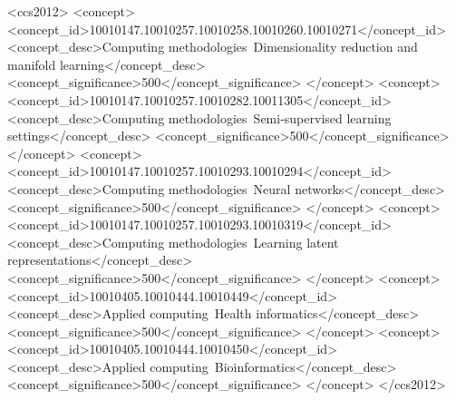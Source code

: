 \begin{CCSXML}
<ccs2012>
   <concept>
       <concept_id>10010147.10010257.10010258.10010260.10010271</concept_id>
       <concept_desc>Computing methodologies~Dimensionality reduction and manifold learning</concept_desc>
       <concept_significance>500</concept_significance>
       </concept>
   <concept>
       <concept_id>10010147.10010257.10010282.10011305</concept_id>
       <concept_desc>Computing methodologies~Semi-supervised learning settings</concept_desc>
       <concept_significance>500</concept_significance>
       </concept>
   <concept>
       <concept_id>10010147.10010257.10010293.10010294</concept_id>
       <concept_desc>Computing methodologies~Neural networks</concept_desc>
       <concept_significance>500</concept_significance>
       </concept>
   <concept>
       <concept_id>10010147.10010257.10010293.10010319</concept_id>
       <concept_desc>Computing methodologies~Learning latent representations</concept_desc>
       <concept_significance>500</concept_significance>
       </concept>
   <concept>
       <concept_id>10010405.10010444.10010449</concept_id>
       <concept_desc>Applied computing~Health informatics</concept_desc>
       <concept_significance>500</concept_significance>
       </concept>
   <concept>
       <concept_id>10010405.10010444.10010450</concept_id>
       <concept_desc>Applied computing~Bioinformatics</concept_desc>
       <concept_significance>500</concept_significance>
       </concept>
 </ccs2012>
\end{CCSXML}



